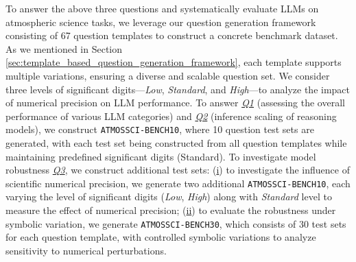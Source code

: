 






To answer the above three questions and systematically evaluate LLMs on atmospheric science tasks, we leverage our question generation framework consisting of 67 question templates to construct a concrete benchmark dataset. As we mentioned in Section \ref{sec:template_based_question_generation_framework}, each template supports multiple variations, ensuring a diverse and scalable question set. We consider three levels of significant digits—\textit{Low}, \textit{Standard}, and \textit{High}—to analyze the impact of numerical precision on LLM performance. 
To answer \textit{\underline{Q1}} (assessing the overall performance of various LLM categories) and \textit{\underline{Q2}} (inference scaling of reasoning models), we construct \texttt{ATMOSSCI-BENCH10}, 
where 10 question test sets are generated, with each test set being constructed from all question templates while maintaining predefined significant digits (Standard). To investigate model robustness \textit{\underline{Q3}}, we construct additional test sets: 
(\underline{i}) to investigate the influence of scientific numerical precision, we generate two additional \texttt{ATMOSSCI-BENCH10}, each varying the level of significant digits (\textit{Low}, \textit{High}) along with \textit{Standard} level to measure the effect of numerical precision;
(\underline{ii}) to evaluate the robustness under symbolic variation, we generate \texttt{ATMOSSCI-BENCH30}, which consists of 30 test sets for each question template, with controlled symbolic variations to analyze sensitivity to numerical perturbations.

